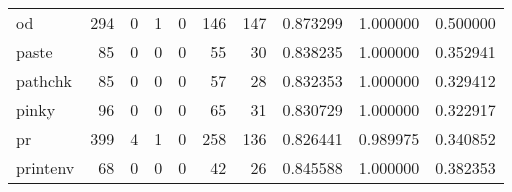 \begin{tabular}{lrrrrrrrrr}
od        &                                   294 &                                                  0 &                                                  1 &                                                  0 &                                                146 &                                                147 &                                           0.873299 &                               1.000000 &                             0.500000 \\
paste     &                                    85 &                                                  0 &                                                  0 &                                                  0 &                                                 55 &                                                 30 &                                           0.838235 &                               1.000000 &                             0.352941 \\
pathchk   &                                    85 &                                                  0 &                                                  0 &                                                  0 &                                                 57 &                                                 28 &                                           0.832353 &                               1.000000 &                             0.329412 \\
pinky     &                                    96 &                                                  0 &                                                  0 &                                                  0 &                                                 65 &                                                 31 &                                           0.830729 &                               1.000000 &                             0.322917 \\
pr        &                                   399 &                                                  4 &                                                  1 &                                                  0 &                                                258 &                                                136 &                                           0.826441 &                               0.989975 &                             0.340852 \\
printenv  &                                    68 &                                                  0 &                                                  0 &                                                  0 &                                                 42 &                                                 26 &                                           0.845588 &                               1.000000 &                             0.382353 \\

\end{tabular}
